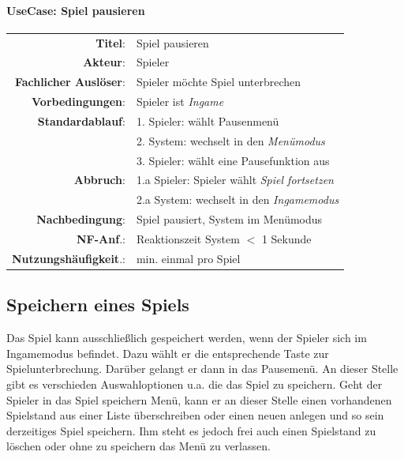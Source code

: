 \paragraph{UseCase: Spiel pausieren}
\begin{center}
	\begin{tabular}{|r l|}
	  \hline
	  \textbf{Titel}: & Spiel pausieren\\
	  \textbf{Akteur}: & Spieler \\
	  \textbf{Fachlicher Auslöser}: & Spieler möchte Spiel unterbrechen \\
	  \textbf{Vorbedingungen}: & Spieler ist \textit{Ingame} \\
	  \hline
	  \textbf{Standardablauf}:
		& 1. Spieler: wählt Pausenmenü \\
		& 2. System: wechselt in den \textit{Menümodus} \\
		& 3. Spieler: wählt eine Pausefunktion aus \\
	  \textbf{Abbruch}:
                & 1.a Spieler: Spieler wählt \textit{Spiel fortsetzen} \\
		& 2.a System:  wechselt in den \textit{Ingamemodus} \\
	  \hline
	  \textbf{Nachbedingung}: & Spiel pausiert, System im Menümodus\\
	  \textbf{NF-Anf}.: & Reaktionszeit System $<$ 1 Sekunde \\
	  \textbf{Nutzungshäufigkeit}.: &  min. einmal pro Spiel \\
	  \hline
	\end{tabular}
\end{center}

\subsection{Speichern eines Spiels}
Das Spiel kann ausschließlich gespeichert werden, wenn der \gls{Spieler} sich im
Ingamemodus befindet. Dazu wählt er die entsprechende Taste zur Spielunterbrechung.
Darüber gelangt er dann in das Pausemenü. An dieser Stelle gibt es verschieden Auswahloptionen 
u.a. die das Spiel zu speichern. Geht der \gls{Spieler} in das Spiel speichern
Menü, kann er an dieser Stelle einen vorhandenen Spielstand aus einer Liste 
überschreiben oder einen neuen anlegen und so sein derzeitiges Spiel speichern. Ihm 
steht es jedoch frei auch einen Spielstand zu löschen oder ohne zu speichern das Menü 
zu verlassen.

